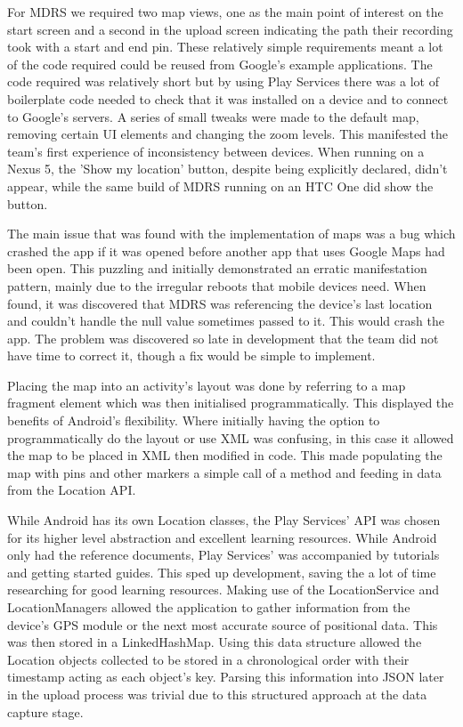 \documentclass{l3proj}
\begin{document}
For MDRS we required two map views, one as the main point of interest on the start screen and a second in the upload screen indicating the path their recording took with a start and end pin. These relatively simple requirements meant a lot of the code required could be reused from Google's example applications. The code required was relatively short but by using Play Services there was a lot of boilerplate code needed to check that it was installed on a device and to connect to Google's servers. A series of small tweaks were made to the default map, removing certain UI elements and changing the zoom levels. This manifested the team's first experience of inconsistency between devices. When running on a Nexus 5, the 'Show my location' button, despite being explicitly declared, didn't appear, while the same build of MDRS running on an HTC One did show the button.

The main issue that was found with the implementation of maps was a bug which crashed the app if it was opened before another app that uses Google Maps had been open. This puzzling and initially demonstrated an erratic manifestation pattern, mainly due to the irregular reboots that mobile devices need. When found, it was discovered that MDRS was referencing the device's last location and couldn't handle the null value sometimes passed to it. This would crash the app. The problem was discovered so late in development that the team did not have time to correct it, though a fix would be simple to implement.

Placing the map into an activity's layout was done by referring to a map fragment element which was then initialised programmatically. This displayed the benefits of Android's flexibility. Where initially having the option to programmatically do the layout or use XML was confusing, in this case it allowed the map to be placed in XML then modified in code. This made populating the map with pins and other markers a simple call of a method and feeding in data from the Location \gls{API}.

While Android has its own Location classes, the Play Services' API was chosen for its higher level abstraction and excellent learning resources. While Android only had the reference documents, Play Services' was accompanied by tutorials and getting started guides. This sped up development, saving the a lot of time researching for good learning resources. Making use of the LocationService and LocationManagers allowed the application to gather information from the device's GPS module or the next most accurate source of positional data. This was then stored in a LinkedHashMap. Using this data structure allowed the Location objects collected to be stored in a chronological order with their timestamp acting as each object's key. Parsing this information into JSON later in the upload process was trivial due to this structured approach at the data capture stage.
\end{document}
